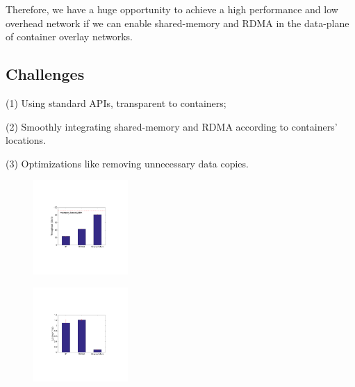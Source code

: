 
Therefore, we have a huge opportunity to achieve a high performance
and low overhead network if we can enable shared-memory and RDMA 
in the data-plane of container overlay networks.

\subsection{Challenges}


(1) Using standard APIs, transparent to containers;


(2) Smoothly integrating shared-memory and RDMA according to containers' locations.

(3) Optimizations like removing unnecessary data copies.

\iffalse

     \begin{figure}[ht]
     \centering 
     \includegraphics[width=0.32\textwidth]{figures/motivation/eval_baremetal_thr.pdf}      
     \label{fig:eval_baremetal_thr}
     \caption{} 
     \end{figure}

     \begin{figure}[ht]
     \centering 
     \includegraphics[width=0.32\textwidth]{figures/motivation/eval_baremetal_latency.pdf}      
     \label{fig:eval_baremetal_latency}
     \caption{} 
     \end{figure}

